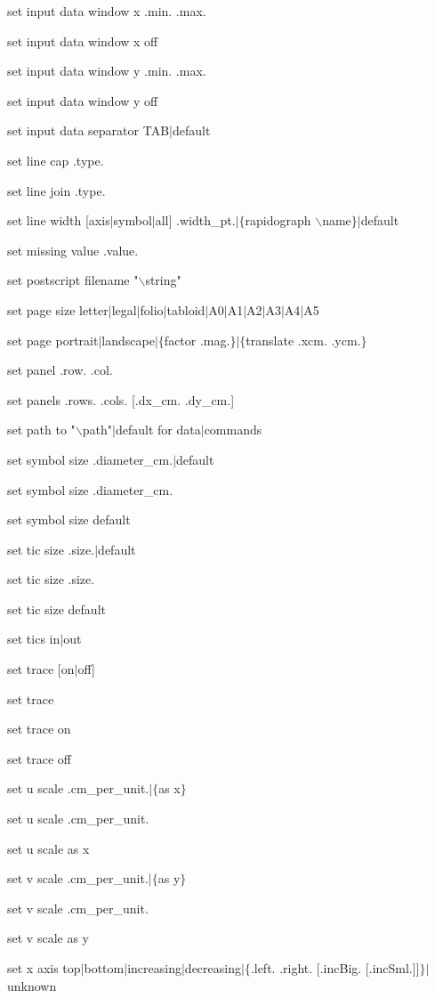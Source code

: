 set input data window x .min. .max.

set input data window x off

set input data window y .min. .max.

set input data window y off

set input data separator TAB$\mid$default

set line cap .type.

set line join .type.

set line width [axis$\mid$symbol$\mid$all] .width\_pt.$\mid$$\lbrace$rapidograph $\backslash$name$\rbrace$$\mid$default

set missing value .value.

set postscript filename "$\backslash$string"

set page size letter$\mid$legal$\mid$folio$\mid$tabloid$\mid$A0$\mid$A1$\mid$A2$\mid$A3$\mid$A4$\mid$A5

set page portrait$\mid$landscape$\mid$$\lbrace$factor .mag.$\rbrace$$\mid$$\lbrace$translate .xcm. .ycm.$\rbrace$

set panel .row. .col.

set panels .rows. .cols. [.dx\_cm. .dy\_cm.]

set path to "$\backslash$path"$\mid$default for data$\mid$commands

set symbol size .diameter\_cm.$\mid$default

set symbol size .diameter\_cm.

set symbol size default

set tic size .size.$\mid$default

set tic size .size.

set tic size default

set tics in$\mid$out

set trace [on$\mid$off]

set trace

set trace on

set trace off

set u scale .cm\_per\_unit.$\mid$$\lbrace$as x$\rbrace$

set u scale .cm\_per\_unit.

set u scale as x

set v scale .cm\_per\_unit.$\mid$$\lbrace$as y$\rbrace$

set v scale .cm\_per\_unit.

set v scale as y

set x axis top$\mid$bottom$\mid$increasing$\mid$decreasing$\mid$$\lbrace$.left. .right. [.incBig. [.incSml.]]$\rbrace$$\mid$unknown

